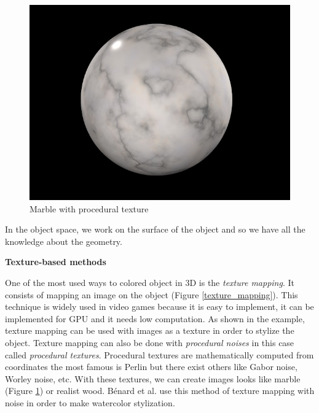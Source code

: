 \begin{figure}
    \begin{center}
    \includegraphics[scale=0.2]{images/marble.jpg}
    \end{center}
    \caption{Marble with procedural texture}
    \label{marble_rendering}
\end{figure}





In the object space, we work on the surface of the object and so we have all the knowledge about the geometry. \newline


\textbf{Texture-based methods}

One of the most used ways to colored object in 3D is the \textit{texture mapping}. It consists of mapping an image on the object (Figure \ref{texture_mapping}). This technique is widely used in video games because it is easy to implement, it can be implemented for GPU and it needs low computation. As shown in the example, texture mapping can be used with images as a texture in order to stylize the object\cite{praun_real-time_2001, klein_non-photorealistic_2000, freudenberg_walk-through_2001}. Texture mapping can also be done with \textit{procedural noises}\cite{perlin_improving_2002} in this case called \textit{procedural textures}. Procedural textures are mathematically computed from coordinates the most famous is Perlin but there exist others like Gabor noise, Worley noise, etc. With these textures, we can create images looks like marble (Figure \ref{marble_rendering}) or realist wood. Bénard et al.\cite{benard_dynamic_2009, benard_dynamic_2010} use this method of texture mapping with noise in order to make watercolor stylization. \newline

